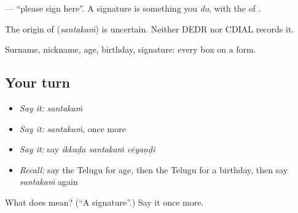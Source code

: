 \textbf{  } — \textquotedblleft{}please sign here\textquotedblright{}. A signature is something you \emph{do}, with the \textbf{} of \textbf{ }.

\begin{cousinweb}
The origin of \textbf{} (\emph{santakaṁ}) is uncertain. Neither DEDR nor CDIAL records it.
\end{cousinweb}

\begin{grammarlens}[title={What you've built}]
Surname, nickname, age, birthday, signature: every box on a form.
\end{grammarlens}

\subsection*{Your turn}
\begin{itemize}
\raggedright
  \item \emph{Say it:} \emph{santakaṁ}
  \item \emph{Say it:} \emph{santakaṁ}, once more
  \item \emph{Say it:} say \emph{ikkaḍa santakaṁ cēyaṇḍi}
  \item \emph{Recall:} say the Telugu for age, then the Telugu for a birthday, then say \emph{santakaṁ} again
\end{itemize}

\begin{tcolorbox}[breakable,colback=teal!4,colframe=teal!35!black,title={Before you move on}]
What does  mean? (\textquotedblleft{}A signature\textquotedblright{}.) Say it once more.
\end{tcolorbox}
